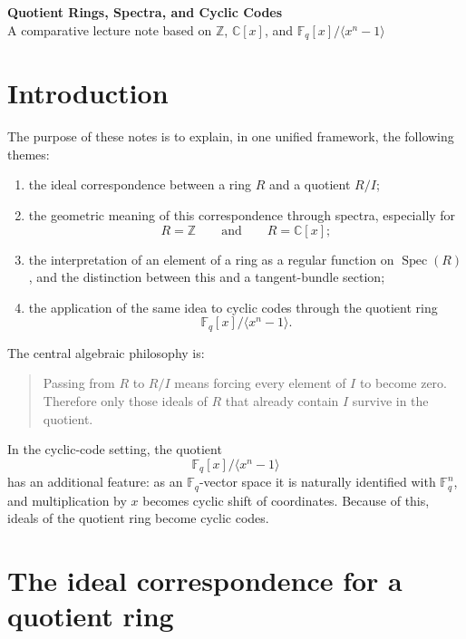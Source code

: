 \documentclass[11pt]{article}
\theoremstyle{definition}
\newcommand{\Z}{\mathbb{Z}}
\newcommand{\C}{\mathbb{C}}
\newcommand{\F}{\mathbb{F}}
\newcommand{\Spec}{\operatorname{Spec}}
\newcommand{\ideal}[1]{\langle #1\rangle}
\begin{document}
	
	\begin{center}
		{\LARGE \textbf{Quotient Rings, Spectra, and Cyclic Codes}}\\[0.5em]
		{\large A comparative lecture note based on $\Z$, $\C[x]$, and $\F_q[x]/\ideal{x^n-1}$}
	\end{center}
	
	\tableofcontents
	
	\section{Introduction}
	
	The purpose of these notes is to explain, in one unified framework, the following themes:
	
	\begin{enumerate}[label=\textbf{(\arabic*)}]
		\item the ideal correspondence between a ring \(R\) and a quotient \(R/I\);
		
		\item the geometric meaning of this correspondence through spectra, especially for
		\[
		R=\Z
		\qquad\text{and}\qquad
		R=\C[x];
		\]
		
		\item the interpretation of an element of a ring as a regular function on \(\Spec(R)\), and the distinction between this and a tangent-bundle section;
		
		\item the application of the same idea to cyclic codes through the quotient ring
		\[
		\F_q[x]/\ideal{x^n-1}.
		\]
	\end{enumerate}
	
	The central algebraic philosophy is:
	
	\begin{quote}
		Passing from \(R\) to \(R/I\) means forcing every element of \(I\) to become zero.  
		Therefore only those ideals of \(R\) that already contain \(I\) survive in the quotient.
	\end{quote}
	
	In the cyclic-code setting, the quotient
	\[
	\F_q[x]/\ideal{x^n-1}
	\]
	has an additional feature: as an \(\F_q\)-vector space it is naturally identified with \(\F_q^n\), and multiplication by \(x\) becomes cyclic shift of coordinates. Because of this, ideals of the quotient ring become cyclic codes.
	
	\section{The ideal correspondence for a quotient ring}
	
\end{document}

